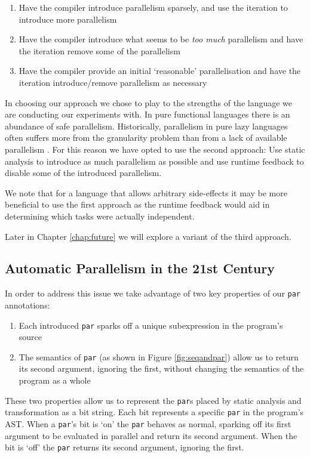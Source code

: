 \begin{enumerate}
    \item Have the compiler introduce parallelism sparsely, and use the
        iteration to introduce more parallelism
    \item Have the compiler introduce what seems to be \emph{too much}
        parallelism and have the iteration remove some of the parallelism
    \item Have the compiler provide an initial `reasonable' parallelisation
        and have the iteration introduce/remove parallelism as necessary
\end{enumerate}

In choosing our approach we chose to play to the strengths of the language we
are conducting our experiments with. In pure functional languages there is an
abundance of safe parallelism. Historically, parallelism in pure lazy languages
often suffers more from the granularity problem than from a lack of available
parallelism . For this reason we have opted to use the second
approach: Use static analysis to introduce as much parallelism as possible and
use runtime feedback to disable some of the introduced parallelism.

We note that for a language that allows arbitrary side-effects it may be more
beneficial to use the first approach as the runtime feedback would aid in
determining which tasks were actually independent.

Later in Chapter \ref{chap:future} we will explore a variant of the third
approach.

\subsection{Automatic Parallelism in the 21st Century}

In order to address this issue we take advantage of
two key properties of our \verb-par- annotations:

\begin{enumerate}
    \item Each introduced \verb-par- sparks off a unique subexpression
            in the program's source
    \item The semantics of \verb-par- (as shown in Figure \ref{fig:seqandpar})
            allow us to return its second argument, ignoring the first,
            without changing the semantics of the program as a whole
\end{enumerate}

These two properties allow us to represent the \verb-par-s placed by static
analysis and transformation as a bit string. Each bit represents a specific
\verb-par- in the program's AST. When a \verb-par-'s bit is `on' the \verb-par-
behaves as normal, sparking off its first argument to be evaluated in parallel
and return its second argument. When the bit is `off' the \verb-par- returns
its second argument, ignoring the first.

